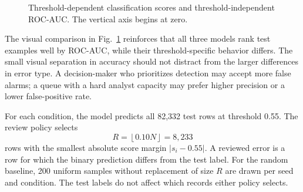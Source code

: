 \documentclass[conference]{IEEEtran}
\begin{document}
\begin{figure}[t]
\centering
{}
\caption{Threshold-dependent classification scores and threshold-independent ROC-AUC. The vertical axis begins at zero.}
\label{fig:model_metrics}
\end{figure}

The visual comparison in Fig.~\ref{fig:model_metrics} reinforces that all three models rank test examples well by ROC-AUC, while their threshold-specific behavior differs. The small visual separation in accuracy should not distract from the larger differences in error type. A decision-maker who prioritizes detection may accept more false alarms; a queue with a hard analyst capacity may prefer higher precision or a lower false-positive rate.

For each condition, the model predicts all 82,332 test rows at threshold 0.55. The review policy selects
\begin{equation}
R = \left\lfloor 0.10N \right\rfloor = 8{,}233
\end{equation}
rows with the smallest absolute score margin $|s_i-0.55|$. A reviewed error is a row for which the binary prediction differs from the test label. For the random baseline, 200 uniform samples without replacement of size $R$ are drawn per seed and condition. The test labels do not affect which records either policy selects.
\end{document}
